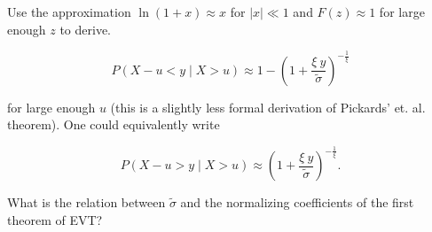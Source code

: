 Use the approximation $\ln(1+x) \approx x$ for $|x| \ll 1$ and $F(z) \approx
1$ for large enough $z$ to derive.


\begin{equation}
    \label{GPD-approx-original}
    P(X-u < y \mid X > u) \approx 1 - \left( 1 + \frac{\xi \ y}{\tilde{\sigma}} \right)^{-\frac{1}{\xi}} 
\end{equation}


for large enough $u$ (this is a slightly less formal derivation of Pickards' et.
al. theorem). One could equivalently write


\begin{equation}
    P(X-u > y \mid X > u) \approx \left( 1 + \frac{\xi \ y}{\tilde{\sigma}} \right)^{-\frac{1}{\xi}}.
\end{equation}


What is the relation between $\tilde{\sigma}$ and the normalizing coefficients
of the first theorem of EVT?
